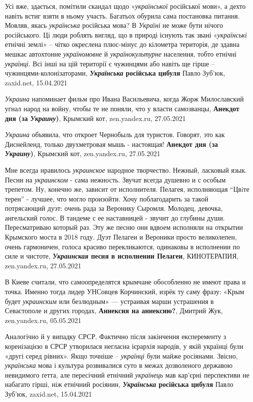 Усі вже, здається, помітили скандал щодо «\emph{української} російської мови»,
а дехто навіть встиг взяти в ньому участь. Багатьох обурила сама постановка
питання. Мовляв, якась \emph{українська} російська мова? В \emph{Україні} не
може бути нічого російського. Ці люди роблять вигляд, що в природі існують так
звані «\emph{українські} етнічні землі» – чітко окреслена плюс-мінус до
кілометра територія, де здавна мешкає автохтонне \emph{україномовне} й
\emph{українокультурне} населення, тобто етнічні \emph{українці}. Всі інші на
цій території є чужинцями або навіть ще гірше – чужинцями-колонізаторами,
\textbf{\emph{Українська} російська цибуля} Павло Зуб'юк, zaxid.net, 15.04.2021

\emph{Украина} напоминает фильм про Ивана Васильевича, когда Жорж Милославский
угнал народ на войну, чтобы те не поняли, что у власти самозванцы,
\textbf{Анекдот дня (за \emph{Украину})}, Крымский кот, zen.yandex.ru,
27.05.2021

\emph{Украина} объявила, что откроет Чернобыль для туристов. Говорят, это как
Диснейленд, только двухметровая мышь - настоящая!  \textbf{Анекдот дня (за
\emph{Украину})}, Крымский кот, zen.yandex.ru, 27.05.2021

Мне всегда нравилось \emph{украинское} народное творчество. Нежный, ласковый
язык.  Песни на \emph{украинском} - сама нежность. Звучат всегда душевно и с
особым трепетом.  Ну, конечно же, зависит от исполнителя.  Пелагея, исполняющая
\enquote{Цвiте терен} - лучшее, что могло произойти.  Хочу поблагодарить за
такой потрясающий дуэт: очень рада за Веронику Сыромля. Молодец, девочка,
ангельский голос. В тандеме с ее наставницей - звучит до глубины души.
Пересматриваю который раз.  Эту же песню они вдвоем исполняли на открытии
Крымского моста в 2018 году. Дуэт Пелагеи и Вероники просто великолепен, очень
гармоничен, голоса красиво перекликаются, одинаковы в исполнении по силе и
чистоте, \textbf{\emph{Украинская} песня в исполнении Пелагеи}, КИНОТЕРАПИЯ,
zen.yandex.ru, 27.05.2021

В Киеве считали, что самоопределятся крымчане обособленно не имеют права и
точка. Именно тогда лидер УНСовцев Корчинский, изрёк ту саму фразу: «Крым будет
\emph{украинским} или безлюдным» — устраивая марши устрашения в Севастополе и
других городах, \textbf{Аннексия на аннексию?}, Дмитрий Жук, zen.yandex.ru,
05.05.2021

Аналогічно й у випадку СРСР. Фактично після закінчення експеременту з
коренізацією в СРСР утворилася негласна ієрархія народів, у якій українці були
«другі серед рівних». Якщо точніше – \emph{українці} були майже росіянами. Звісно,
\emph{українська} мова і культура розвивалися суто в межах дозволеного державою
невидимого ґетта, але пересічний етнічний \emph{українець} мав кар'єрні перспективи не
набагато гірші, ніж етнічний росіянин, 
\textbf{\emph{Українська} російська цибуля} Павло Зуб'юк, zaxid.net, 15.04.2021

